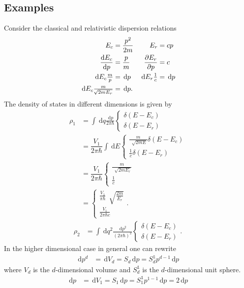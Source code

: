 \documentclass[a4paper,10pt]{article}
\newcommand{\td}{\,\text{d}}
\newcommand{\id}{\mathds{1}}
\numberwithin{equation}{section}
\begin{document}
\begin{multicols}{2}
\subsection{Examples}
Consider the classical and relativistic dispersion relations
\begin{align} 
  E_c &= \dfrac{p^2}{2m} & E_r &= cp\\
  \diff[]{E_c}{p} &= \dfrac{p}{m} & \diffp[]{E_r}{p} &= c\\
  \td E_c \tfrac{m}{p} &= \td p & \td E_r \tfrac{1}{c} &= \td p\\
  \td E_c \tfrac{m}{\,\sqrt[]{2mE_r}} &= \td p
.\end{align} 
The density of states in different dimensions is given by
\begin{align} 
  \rho _1 &= \int_{}^{}\td q\tfrac{\td p}{2\pi \hbar } \begin{cases}
    \delta (E-E_c)\\
    \delta (E-E_r)
  \end{cases}\\
          &= \dfrac{V_1}{2\pi \hbar }\int_{}^{}\td E \begin{cases}
            \tfrac{m}{\,\sqrt[]{2mE}}\delta (E-E_c)\\
            \tfrac{1}{c}\delta (E-E_r)
          \end{cases}\\
          &= \dfrac{V_1}{2\pi \hbar }\begin{cases}
            \tfrac{m}{\,\sqrt[]{2mE_r}}\\
            \tfrac{1}{c}
          \end{cases}\\
          &= \begin{cases}
            \tfrac{V_1}{\pi \hbar }\,\sqrt[]{\tfrac{2m}{E_r}}\\
            \tfrac{V_1}{2\pi \hbar c}
          \end{cases}
.\end{align} 
\begin{align} 
  \rho _2 &= \int_{}^{}\td q^2\tfrac{\td p^2}{(2\pi \hbar )^2}\begin{cases}
    \delta (E-E_c)\\
    \delta (E-E_r)
  \end{cases}
.\end{align} 
In the higher dimensional case in general one can rewrite
\begin{align} 
  \td p^d &= \td V_d = S_d\td p = S_d^\id p^{d-1}\td p 
\end{align} 
where $V_d$ is the $d$-dimensional volume and $S_d^\id$ is the $d$-dimensional unit sphere.
\begin{align} 
  \td p &= \td V_1 = S_1\td p = S_1^\id p^{1-1}\td p = 2\td p
\end{align} 


\end{multicols}
\end{document}
